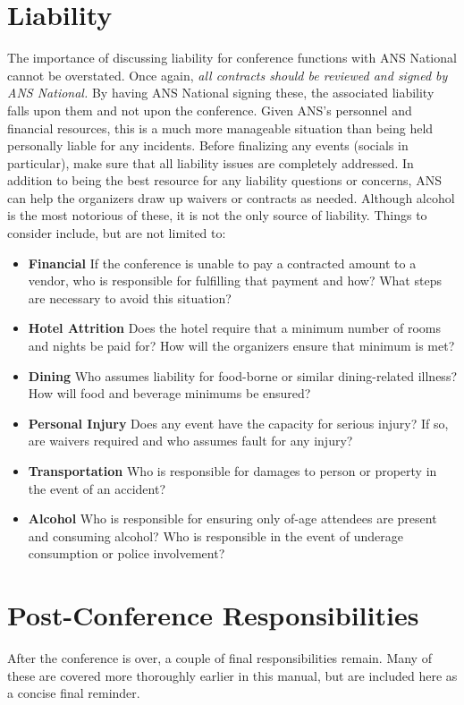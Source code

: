 \documentclass[12pt]{article}
\begin{document}
\section{Liability}
The importance of discussing liability for conference functions with ANS National cannot be overstated.
Once again, \emph{all contracts should be reviewed and signed by ANS National.}
By having ANS National signing these, the associated liability falls upon them and not upon the conference.
Given ANS's personnel and financial resources, this is a much more manageable situation than being held personally liable for any incidents.
Before finalizing any events (socials in particular), make sure that all liability issues are completely addressed. 
In addition to being the best resource for any liability questions or concerns, ANS can help the organizers draw up waivers or contracts as needed.
Although alcohol is the most notorious of these, it is not the only source of liability.
Things to consider include, but are not limited to:
\begin{itemize}
    \item \textbf{Financial} If the conference is unable to pay a contracted amount to a vendor, who is responsible for fulfilling that payment and how? What steps are necessary to avoid this situation?
    \item \textbf{Hotel Attrition} Does the hotel require that a minimum number of rooms and nights be paid for? How will the organizers ensure that minimum is met?
    \item \textbf{Dining} Who assumes liability for food-borne or similar dining-related illness? How will food and beverage minimums be ensured?
    \item \textbf{Personal Injury} Does any event have the capacity for serious injury? If so, are waivers required and who assumes fault for any injury?
    \item \textbf{Transportation} Who is responsible for damages to person or property in the event of an accident?
    \item \textbf{Alcohol} Who is responsible for ensuring only of-age attendees are present and consuming alcohol? Who is responsible in the event of underage consumption or police involvement?
\end{itemize}

\clearpage

\section{Post-Conference Responsibilities}
After the conference is over, a couple of final responsibilities remain. Many of these are covered more thoroughly earlier in this manual, but are included here as a concise final reminder.
\end{document}
